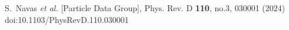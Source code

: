 S.~Navas \textit{et al.} [Particle Data Group],
Phys. Rev. D \textbf{110}, no.3, 030001 (2024)
doi:10.1103/PhysRevD.110.030001
